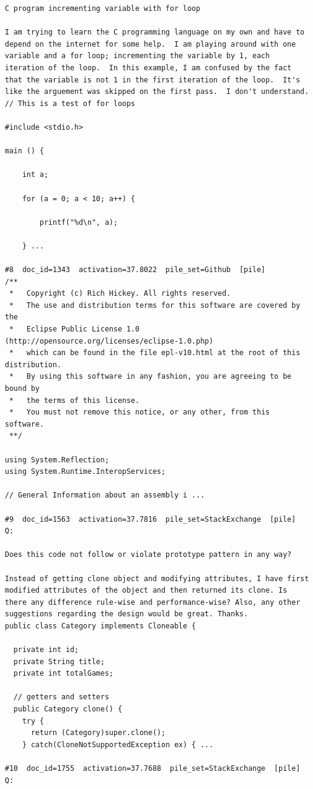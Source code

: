 \begin{verbatim}
C program incrementing variable with for loop

I am trying to learn the C programming language on my own and have to depend on the internet for some help.  I am playing around with one variable and a for loop; incrementing the variable by 1, each iteration of the loop.  In this example, I am confused by the fact that the variable is not 1 in the first iteration of the loop.  It's like the arguement was skipped on the first pass.  I don't understand.
// This is a test of for loops

#include <stdio.h>

main () {

    int a;

    for (a = 0; a < 10; a++) {

        printf("%d\n", a);

    } ...

#8  doc_id=1343  activation=37.8022  pile_set=Github  [pile]
﻿/**
 *   Copyright (c) Rich Hickey. All rights reserved.
 *   The use and distribution terms for this software are covered by the
 *   Eclipse Public License 1.0 (http://opensource.org/licenses/eclipse-1.0.php)
 *   which can be found in the file epl-v10.html at the root of this distribution.
 *   By using this software in any fashion, you are agreeing to be bound by
 * 	 the terms of this license.
 *   You must not remove this notice, or any other, from this software.
 **/

using System.Reflection;
using System.Runtime.InteropServices;

// General Information about an assembly i ...

#9  doc_id=1563  activation=37.7816  pile_set=StackExchange  [pile]
Q:

Does this code not follow or violate prototype pattern in any way?

Instead of getting clone object and modifying attributes, I have first modified attributes of the object and then returned its clone. Is there any difference rule-wise and performance-wise? Also, any other suggestions regarding the design would be great. Thanks.
public class Category implements Cloneable {

  private int id;
  private String title;
  private int totalGames;

  // getters and setters
  public Category clone() {
    try {
      return (Category)super.clone();
    } catch(CloneNotSupportedException ex) { ...

#10  doc_id=1755  activation=37.7688  pile_set=StackExchange  [pile]
Q:


\end{verbatim}
